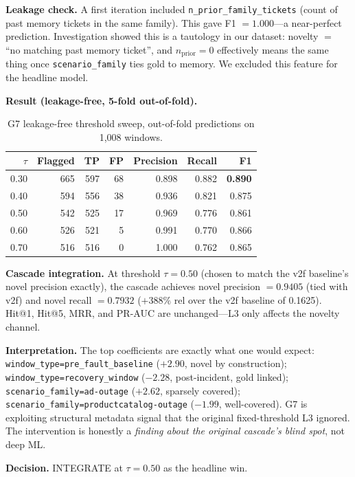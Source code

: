 \textbf{Leakage check.} A first iteration included \texttt{n\_prior\_family\_tickets} (count of past memory tickets in the same family). This gave F1 $= 1.000$---a near-perfect prediction. Investigation showed this is a tautology in our dataset: novelty $=$ ``no matching past memory ticket'', and $n_{\text{prior}} = 0$ effectively means the same thing once \texttt{scenario\_family} ties gold to memory. We excluded this feature for the headline model.

\textbf{Result (leakage-free, 5-fold out-of-fold).}

\begin{table}[h]
\centering
\caption{G7 leakage-free threshold sweep, out-of-fold predictions on 1{,}008 windows.}
\label{tab:g7-sweep}
\small
\begin{tabular}{rrrrrrr}
\toprule
$\tau$ & Flagged & TP & FP & Precision & Recall & F1 \\
\midrule
0.30 & 665 & 597 & 68 & 0.898 & 0.882 & \textbf{0.890} \\
0.40 & 594 & 556 & 38 & 0.936 & 0.821 & 0.875 \\
0.50 & 542 & 525 & 17 & 0.969 & 0.776 & 0.861 \\
0.60 & 526 & 521 & 5  & 0.991 & 0.770 & 0.866 \\
0.70 & 516 & 516 & 0  & 1.000 & 0.762 & 0.865 \\
\bottomrule
\end{tabular}
\end{table}

\textbf{Cascade integration.} At threshold $\tau = 0.50$ (chosen to match the v2f baseline's novel precision exactly), the cascade achieves novel precision $= 0.9405$ (tied with v2f) and novel recall $= 0.7932$ ($+388\%$ rel over the v2f baseline of 0.1625). Hit@1, Hit@5, MRR, and PR-AUC are unchanged---L3 only affects the novelty channel.

\textbf{Interpretation.} The top coefficients are exactly what one would expect:
\texttt{window\_type=pre\_fault\_baseline} ($+2.90$, novel by construction);
\texttt{window\_type=recovery\_window} ($-2.28$, post-incident, gold linked);
\texttt{scenario\_family=ad-outage} ($+2.62$, sparsely covered);
\texttt{scenario\_family=productcatalog-outage} ($-1.99$, well-covered).
G7 is exploiting structural metadata signal that the original fixed-threshold L3 ignored. The intervention is honestly a \emph{finding about the original cascade's blind spot}, not deep ML.

\textbf{Decision.} INTEGRATE at $\tau = 0.50$ as the headline win.

